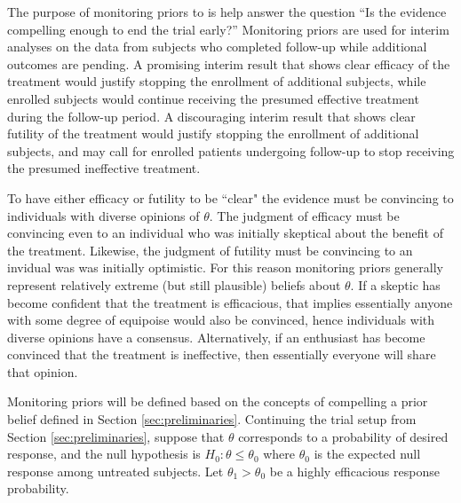\documentclass[12pt]{article}
\begin{document}
The purpose of monitoring priors to is help answer the question ``Is the evidence compelling enough to end the trial early?'' Monitoring priors are used for interim analyses on the data from subjects who completed follow-up while additional outcomes are pending. A promising interim result that shows clear efficacy of the treatment would justify stopping the enrollment of additional subjects, while enrolled subjects would continue receiving the presumed effective treatment during the follow-up period. A discouraging interim result that shows clear futility of the treatment would justify stopping the enrollment of additional subjects, and may call for enrolled patients undergoing follow-up to stop receiving the presumed ineffective treatment. 

To have either efficacy or futility to be ``clear" the evidence must be convincing to individuals with diverse opinions of $\theta$. The judgment of efficacy must be convincing even to an individual who was initially skeptical about the benefit of the treatment. Likewise, the judgment of futility must be convincing to an invidual was was initially optimistic. For this reason monitoring priors generally represent relatively extreme (but still plausible) beliefs about $\theta$. If a skeptic has become confident that the treatment is efficacious, 
that implies essentially anyone with some degree of equipoise would also be convinced, hence individuals with diverse opinions have a consensus. Alternatively, if an enthusiast has become convinced that the treatment is ineffective, then essentially everyone will share that opinion. 

%
%

Monitoring priors will be defined based on the concepts of compelling a prior belief defined in Section \ref{sec:preliminaries}. Continuing the trial setup from Section \ref{sec:preliminaries}, suppose that $\theta$ corresponds to a probability of desired response, and the null hypothesis is $H_0:\theta\leq\theta_0$ where $\theta_0$ is the expected null response among untreated subjects. 
%
Let $\theta_1>\theta_0$ be a highly efficacious response probability.
%
\end{document}
